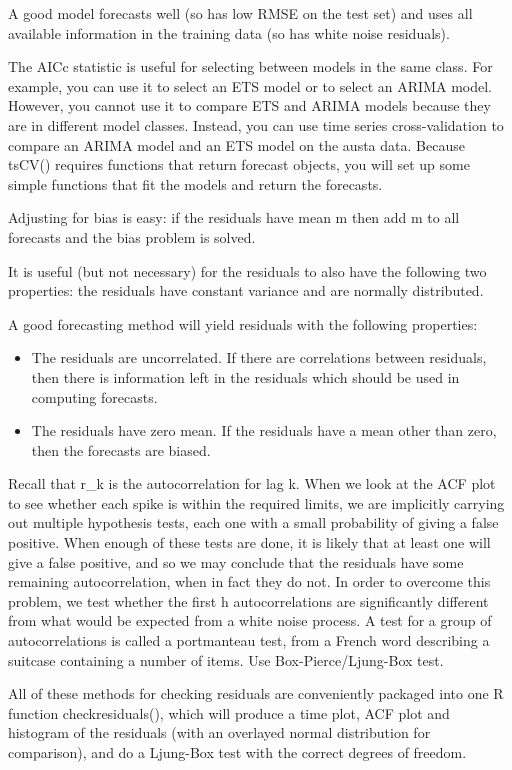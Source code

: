 \documentclass[]{book}
\begin{document}
A good model forecasts well (so has low RMSE on the test set) and uses
all available information in the training data (so has white noise
residuals).

The AICc statistic is useful for selecting between models in the same
class. For example, you can use it to select an ETS model or to select
an ARIMA model. However, you cannot use it to compare ETS and ARIMA
models because they are in different model classes. Instead, you can use
time series cross-validation to compare an ARIMA model and an ETS model
on the austa data. Because tsCV() requires functions that return
forecast objects, you will set up some simple functions that fit the
models and return the forecasts.

Adjusting for bias is easy: if the residuals have mean m then add m to
all forecasts and the bias problem is solved.

It is useful (but not necessary) for the residuals to also have the
following two properties: the residuals have constant variance and are
normally distributed.

A good forecasting method will yield residuals with the following
properties:

\begin{itemize}
\item
  The residuals are uncorrelated. If there are correlations between
  residuals, then there is information left in the residuals which
  should be used in computing forecasts.
\item
  The residuals have zero mean. If the residuals have a mean other than
  zero, then the forecasts are biased.
\end{itemize}

Recall that r\_k is the autocorrelation for lag k. When we look at the
ACF plot to see whether each spike is within the required limits, we are
implicitly carrying out multiple hypothesis tests, each one with a small
probability of giving a false positive. When enough of these tests are
done, it is likely that at least one will give a false positive, and so
we may conclude that the residuals have some remaining autocorrelation,
when in fact they do not. In order to overcome this problem, we test
whether the first h autocorrelations are significantly different from
what would be expected from a white noise process. A test for a group of
autocorrelations is called a portmanteau test, from a French word
describing a suitcase containing a number of items. Use
Box-Pierce/Ljung-Box test.

All of these methods for checking residuals are conveniently packaged
into one R function checkresiduals(), which will produce a time plot,
ACF plot and histogram of the residuals (with an overlayed normal
distribution for comparison), and do a Ljung-Box test with the correct
degrees of freedom.
\end{document}
